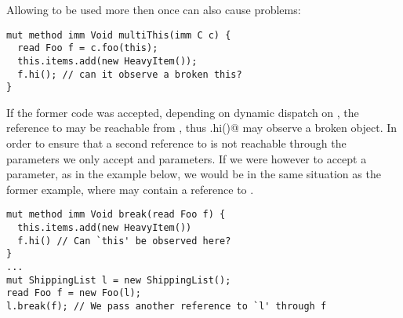 \noindent Allowing \Q@this@ to be used more then once can also cause problems:
\saveSpace
\begin{lstlisting}
mut method imm Void multiThis(imm C c) {
  read Foo f = c.foo(this);
  this.items.add(new HeavyItem());
  f.hi(); // can it observe a broken this?
}
\end{lstlisting}
\saveSpace
\noindent If the former code was accepted, depending on dynamic dispatch on \Q@c@,
the reference to \Q@this@ may be reachable from \Q@f@, thus \Q@f.hi()@ may observe a broken object.
In order to ensure that a second reference to \Q@this@ is not reachable through the parameters we only accept \Q@imm@ and \Q@capsule@ parameters.
If we were however to accept a \Q@read@ parameter, as in the example below,
we would be in the same situation as the former example, where \Q@f@ may contain
a reference to \Q@this@.
\saveSpace
\begin{lstlisting}
mut method imm Void break(read Foo f) {
  this.items.add(new HeavyItem())
  f.hi() // Can `this' be observed here?
}
...
mut ShippingList l = new ShippingList();
read Foo f = new Foo(l);
l.break(f); // We pass another reference to `l' through f
\end{lstlisting}
\saveSpace



